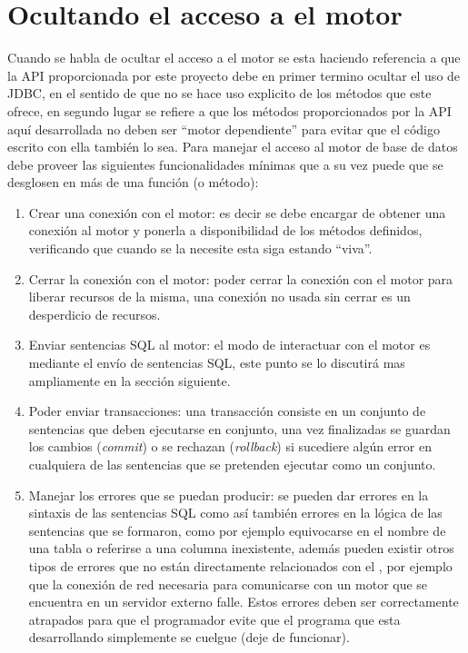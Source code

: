 \section{Ocultando el acceso a el motor}
Cuando se habla de ocultar el acceso a el motor se esta haciendo referencia a que la API proporcionada por este proyecto debe en primer termino ocultar el uso de JDBC, en el sentido de que no se hace uso explicito de los métodos que este ofrece, en segundo lugar se refiere a que los métodos proporcionados por la API aquí desarrollada no deben ser ``motor dependiente'' para evitar que el código escrito con ella también lo sea. Para manejar el acceso al motor de base de datos \jj debe proveer las siguientes funcionalidades mínimas que a su vez puede que se desglosen en más de una función (o método):
%
\begin{enumerate}
%
\item Crear una conexión con el motor: es decir se debe encargar de obtener una conexión al motor y ponerla a disponibilidad de los métodos definidos, verificando que cuando se la necesite esta siga estando ``viva''.
%
\item Cerrar la conexión con el motor: poder cerrar la conexión con el motor para liberar recursos de la misma, una conexión no usada sin cerrar es un desperdicio de recursos.
%
\item Enviar sentencias SQL al motor: el modo de interactuar con el motor es mediante el envío de sentencias SQL, este punto se lo discutirá mas ampliamente en la sección siguiente.
%
\item Poder enviar transacciones: una transacción consiste en un conjunto de sentencias que deben ejecutarse en conjunto, una vez finalizadas se guardan los cambios (\textit{commit}) o se rechazan (\textit{rollback}) si sucediere algún error en cualquiera de las sentencias que se pretenden ejecutar como un conjunto.
%
\item Manejar los errores que se puedan producir: se pueden dar errores en la sintaxis de las sentencias SQL como así también errores en la lógica de las sentencias que se formaron, como por ejemplo equivocarse en el nombre de una tabla o referirse a una columna inexistente, además pueden existir otros tipos de errores que no están directamente relacionados con el \dd, por ejemplo que la conexión de red necesaria para comunicarse con un motor que se encuentra en un servidor externo falle. Estos errores deben ser correctamente atrapados para que el programador evite que el programa que esta desarrollando simplemente se cuelgue (deje de funcionar).

\end{enumerate}
